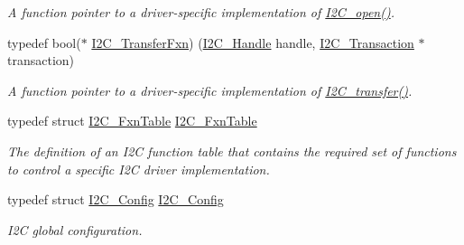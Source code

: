 \begin{DoxyCompactItemize}
\begin{DoxyCompactList}\small\item\em A function pointer to a driver-\/specific implementation of \hyperlink{_i2_c_8h_ae1aa99e1fee4517406018e10025cca0e}{I2\+C\+\_\+open()}. \end{DoxyCompactList}\item 
typedef bool($\ast$ \hyperlink{_i2_c_8h_aa785484e689c79262f98208689fecd38}{I2\+C\+\_\+\+Transfer\+Fxn}) (\hyperlink{_i2_c_8h_a5809a229f8395c87f59e63128195c1bf}{I2\+C\+\_\+\+Handle} handle, \hyperlink{struct_i2_c___transaction}{I2\+C\+\_\+\+Transaction} $\ast$transaction)
\begin{DoxyCompactList}\small\item\em A function pointer to a driver-\/specific implementation of \hyperlink{_i2_c_8h_ac5d827b67fe77d7d179026941cc069d7}{I2\+C\+\_\+transfer()}. \end{DoxyCompactList}\item 
typedef struct \hyperlink{struct_i2_c___fxn_table}{I2\+C\+\_\+\+Fxn\+Table} \hyperlink{_i2_c_8h_abdc2b5945fac9724271b088437881d68}{I2\+C\+\_\+\+Fxn\+Table}
\begin{DoxyCompactList}\small\item\em The definition of an I2\+C function table that contains the required set of functions to control a specific I2\+C driver implementation. \end{DoxyCompactList}\item 
typedef struct \hyperlink{struct_i2_c___config}{I2\+C\+\_\+\+Config} \hyperlink{_i2_c_8h_a06eeddd0e8a5dd24a18566b65099d588}{I2\+C\+\_\+\+Config}
\begin{DoxyCompactList}\small\item\em I2\+C global configuration. \end{DoxyCompactList}\end{DoxyCompactItemize}
